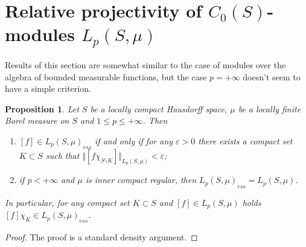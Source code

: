 \documentclass[12pt]{article}
\newtheorem{proposition}[theorem]{Proposition}
\begin{document}

\section{Relative projectivity of \texorpdfstring{$C_0(S)$}{C0S}-modules
  \texorpdfstring{$L_p(S,\mu)$}{LpSmu}
 }\label{SectionRelativeProjectivityOfC0SModulesLpSmu}

Results of this section are somewhat similar to the case of modules over the
algebra of bounded measurable functions, but the case $p=+\infty$ doesn't seem
to have a simple criterion.

\begin{proposition}\label{LpEssC0ModCharac} Let $S$ be a locally compact
    Hausdorff space, $\mu$ be a locally finite Borel measure on $S$ and $1\leq
        p\leq+\infty$. Then
    \begin{enumerate}[label = (\roman*)]
        \item $[f]\in {L_p(S,\mu)}_{ess}$ if and only if for any $\varepsilon
                  >0$ there exists a compact set $K\subset S$ such that $\Vert
                  [f\chi_{S\setminus K}]\Vert_{L_p(S,\mu)}< \varepsilon$;
        \item if $p<+\infty$ and $\mu$ is inner compact regular, then
              ${L_p(S,\mu)}_{ess}=L_p(S,\mu)$.
    \end{enumerate}
    In particular, for any compact set $K\subset S$ and $[f]\in L_p(S,\mu)$
    holds $[f]\chi_K\in {L_p(S,\mu)}_{ess}$.
\end{proposition}
\begin{proof} The proof is a standard density argument.
\end{proof}
\end{document}
